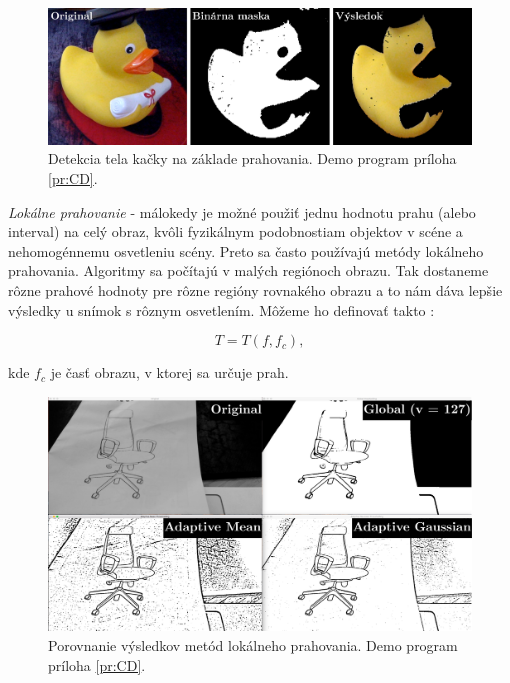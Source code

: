 \begin{figure}[H]
\begin{center}
	\includegraphics[scale=0.25]{images/trasholding_duck}
	\caption{Detekcia tela kačky na základe prahovania. Demo program príloha \ref{pr:CD}.}
	\end{center}
\end{figure}


\textit{Lokálne prahovanie} - málokedy je možné použiť jednu hodnotu prahu (alebo interval) na celý obraz, kvôli fyzikálnym podobnostiam objektov v scéne a nehomogénnemu osvetleniu scény. Preto sa často používajú metódy lokálneho prahovania. Algoritmy sa počítajú v malých regiónoch obrazu. Tak dostaneme rôzne prahové hodnoty pre rôzne regióny rovnakého obrazu a to nám dáva lepšie výsledky u snímok s rôznym osvetlením. Môžeme ho definovať takto \cite{fit_trasholding}\cite{openCV_trasholding}:

\begin{equation}
    T=T(f {,} f_c){,}
\end{equation}

kde $f_c$ je časť obrazu, v ktorej sa určuje prah. 

\begin{figure}[H]
\begin{center}
	\includegraphics[scale=0.13]{images/trasholding}
	\caption{Porovnanie výsledkov metód lokálneho prahovania. Demo program príloha \ref{pr:CD}.}
	\end{center}
\end{figure}



